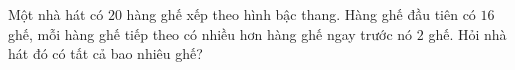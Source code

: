 \begin{ex}
Một nhà hát có $20$ hàng ghế xếp theo hình bậc thang. Hàng ghế đầu tiên có $16$ ghế, mỗi hàng ghế tiếp theo có nhiều hơn hàng ghế ngay trước nó $2$ ghế. Hỏi nhà hát đó có tất cả bao nhiêu ghế?
\end{ex}

